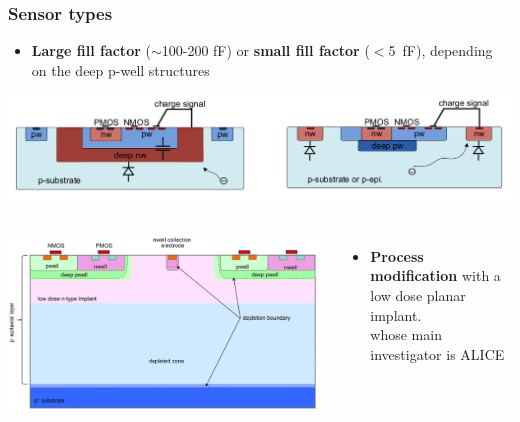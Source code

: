     \begin{frame}
        \frametitle{Sensor types}
            \begin{itemize}
                \item \textbf{Large fill factor} ($\sim$100-200 \si{fF}) or \textbf{small fill factor} ($<$\SI{5}{fF}), depending on the deep p-well structures
            \end{itemize}
            \includegraphics[width=1.05\linewidth]{figures/Pixel_detectors/large_small_sensor_scheme.png}\\
            \begin{columns}
                    \includegraphics[width=1.1\linewidth]{figures/Pixel_detectors/ALPIDE_after_PM.png}
                    \begin{itemize}
                        \item \textbf{Process modification} with a low dose planar implant. \\
                        whose main investigator is ALICE\\
                    \end{itemize} 
            \end{columns}

            \end{frame} 


